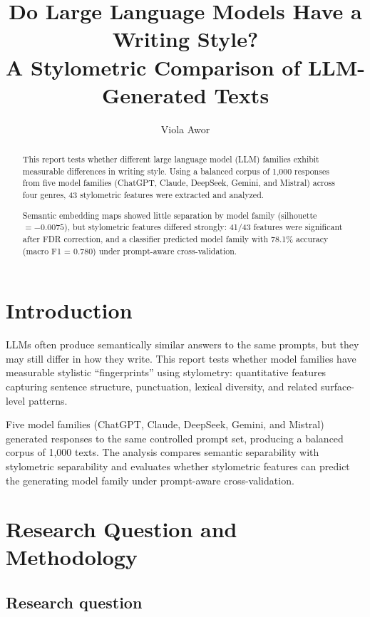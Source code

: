 
\title{Do Large Language Models Have a Writing Style?\\
\large A Stylometric Comparison of LLM-Generated Texts}
\author{Viola Awor}
\date{}


\maketitle

\begin{abstract}
This report tests whether different large language model (LLM) families exhibit measurable differences in writing style. Using a balanced corpus of 1{,}000 responses from five model families (ChatGPT, Claude, DeepSeek, Gemini, and Mistral) across four genres, 43 stylometric features were extracted and analyzed.

Semantic embedding maps showed little separation by model family (silhouette $=-0.0075$), but stylometric features differed strongly: 41/43 features were significant after FDR correction, and a classifier predicted model family with 78.1\% accuracy (macro F1 = 0.780) under prompt-aware cross-validation.
\end{abstract}

\section{Introduction}
LLMs often produce semantically similar answers to the same prompts, but they may still differ in how they write. This report tests whether model families have measurable stylistic ``fingerprints'' using stylometry: quantitative features capturing sentence structure, punctuation, lexical diversity, and related surface-level patterns.

Five model families (ChatGPT, Claude, DeepSeek, Gemini, and Mistral) generated responses to the same controlled prompt set, producing a balanced corpus of 1{,}000 texts. The analysis compares semantic separability with stylometric separability and evaluates whether stylometric features can predict the generating model family under prompt-aware cross-validation.

\section{Research Question and Methodology}
\subsection{Research question}

